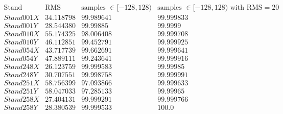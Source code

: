 $ \begin{array}{c||c|c|c}  
\text{Stand} & \text{RMS} & \text{samples }\in [-128,128) & \text{samples }\in [-128,128)\text{ with RMS}=20 \\ 
Stand001X & 34.118798 & 99.989641 & 99.999833 \\ 
Stand001Y & 28.544380 & 99.99885 & 99.9999 \\ 
Stand010X & 55.174325 & 98.006408 & 99.999708 \\ 
Stand010Y & 46.112851 & 99.452791 & 99.999925 \\ 
Stand054X & 43.717739 & 99.662691 & 99.999641 \\ 
Stand054Y & 47.889111 & 99.243641 & 99.999916 \\ 
Stand248X & 26.123759 & 99.999583 & 99.99985 \\ 
Stand248Y & 30.707551 & 99.998758 & 99.999991 \\ 
Stand251X & 58.756399 & 97.093866 & 99.999633 \\ 
Stand251Y & 58.047033 & 97.285133 & 99.99965 \\ 
Stand258X & 27.404131 & 99.999291 & 99.999766 \\ 
Stand258Y & 28.380539 & 99.999533 & 100.0
 \end{array}  
$